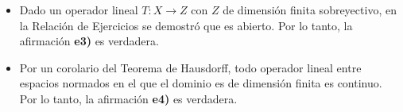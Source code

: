 \documentclass[12pt]{article}
\begin{document}
\begin{ejercicio}
\begin{enumerate}[label=\alph*)]
\begin{itemize}
                Este funcional es lineal, pero no es continuo pues, para cada $n \in \bb{N}$, se tiene que $\|e_n\|_\infty = 1$ y $|f(e_n)| = n$, por lo que no existe una constante $C > 0$ tal que $|f(x)| \leq C \|x\|_\infty$ para todo $x \in c_{00}$. Como $ \dim \bb{K}=1$ finita, se deduce que $f$ es un funcional lineal no continuo que llega a un espacio de dimensión finita. Por lo tanto, la afirmación \textbf{e2)} es falsa.
                
                \item Dado un operador lineal $T \colon X\to Z$ con $Z$ de dimensión finita sobreyectivo, en la Relación de Ejercicios se demostró que es abierto. Por lo tanto, la afirmación \textbf{e3)} es verdadera.

                \item Por un corolario del Teorema de Hausdorff, todo operador lineal entre espacios normados en el que el dominio es de dimensión finita es continuo. Por lo tanto, la afirmación \textbf{e4)} es verdadera.
            \end{itemize}
        \end{enumerate}
    \end{ejercicio}
\end{document}

